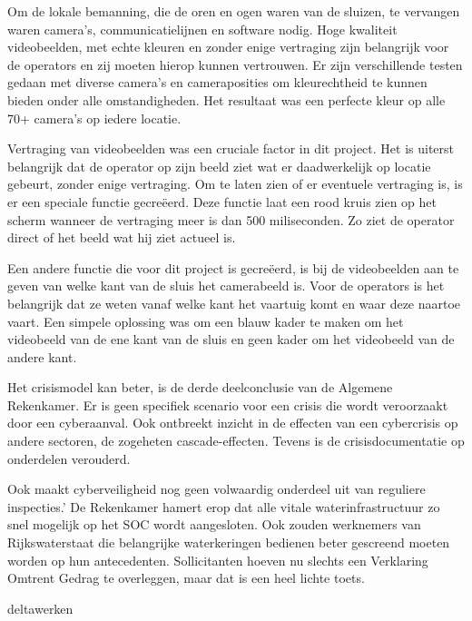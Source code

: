 \cite{gww29032021kantelendesluisdeur}
Om de lokale bemanning, die de oren en ogen waren van de sluizen, te vervangen waren camera’s, communicatielijnen en software nodig. Hoge kwaliteit videobeelden, met echte kleuren en zonder enige vertraging zijn belangrijk voor de operators en zij moeten hierop kunnen vertrouwen. Er zijn verschillende testen gedaan met diverse camera’s en cameraposities om kleurechtheid te kunnen bieden onder alle omstandigheden. Het resultaat was een perfecte kleur op alle 70+ camera’s op iedere locatie.

Vertraging van videobeelden was een cruciale factor in dit project. Het is uiterst belangrijk dat de operator op zijn beeld ziet wat er daadwerkelijk op locatie gebeurt, zonder enige vertraging. Om te laten zien of er eventuele vertraging is, is er een speciale functie gecreëerd. Deze functie laat een rood kruis zien op het scherm wanneer de vertraging meer is dan 500 miliseconden. Zo ziet de operator direct of het beeld wat hij ziet actueel is. 

Een andere functie die voor dit project is gecreëerd, is bij de videobeelden aan te geven van welke kant van de sluis het camerabeeld is. Voor de operators is het belangrijk dat ze weten vanaf welke kant het vaartuig komt en waar deze naartoe vaart. Een simpele oplossing was om een blauw kader te maken om het videobeeld van de ene kant van de sluis en geen kader om het videobeeld van de andere kant. 


\cite{thkwaterwerken}
Het crisismodel kan beter, is de derde deelconclusie van de Algemene Rekenkamer. Er is geen specifiek scenario voor een crisis die wordt veroorzaakt door een cyberaanval. Ook ontbreekt inzicht in de effecten van een cybercrisis op andere sectoren, de zogeheten cascade-effecten. Tevens is de crisisdocumentatie op onderdelen verouderd.

\cite{rekenkamercybersecWater}
Ook maakt cyberveiligheid nog geen volwaardig onderdeel uit van reguliere inspecties.’ De Rekenkamer hamert erop dat alle vitale waterinfrastructuur zo snel mogelijk op het SOC wordt aangesloten. Ook zouden werknemers van Rijkswaterstaat die belangrijke waterkeringen bedienen beter gescreend moeten worden op hun antecedenten. Sollicitanten hoeven nu slechts een Verklaring Omtrent Gedrag te overleggen, maar dat is een heel lichte toets.

\cite{hackerWaterwerk}
deltawerken

